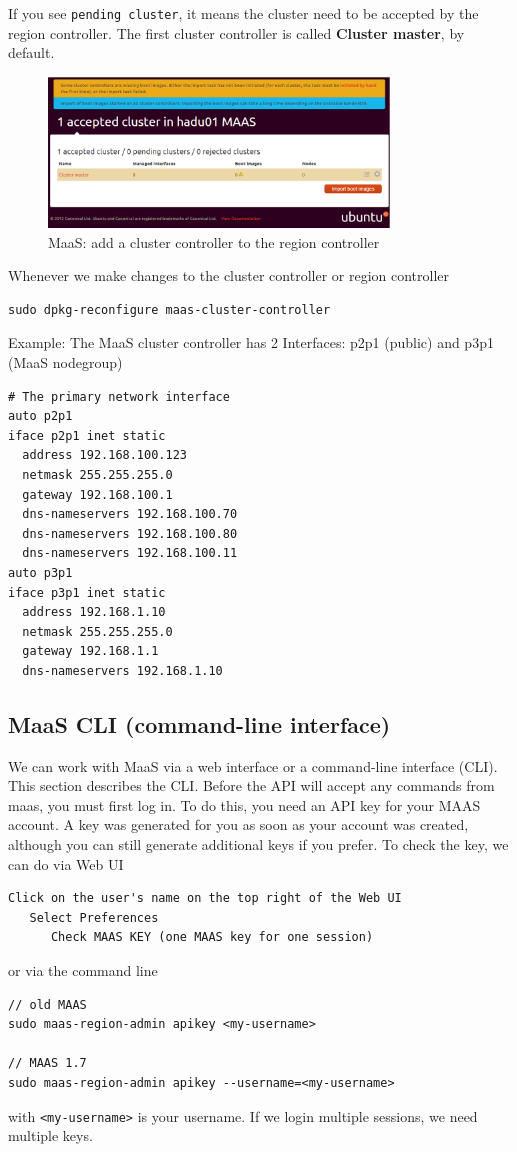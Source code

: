 If you see \verb!pending cluster!,
it means the cluster need to be accepted by the region controller. The first
cluster controller is called {\bf Cluster master}, by default.

\begin{figure}[hbt]
  \centerline{\includegraphics[height=4cm,
    angle=0]{./images/MaaS_cluster_controller.eps}}
\caption{MaaS: add a cluster controller to the region controller}
\label{fig:MaaS_cluster_controller}
\end{figure}

Whenever we make changes to the
cluster controller or region controller
\begin{verbatim}
sudo dpkg-reconfigure maas-cluster-controller 
\end{verbatim}

Example: The MaaS cluster controller has 2 Interfaces: p2p1 (public) and p3p1
(MaaS nodegroup)
\begin{verbatim}
# The primary network interface
auto p2p1
iface p2p1 inet static
  address 192.168.100.123
  netmask 255.255.255.0
  gateway 192.168.100.1
  dns-nameservers 192.168.100.70
  dns-nameservers 192.168.100.80
  dns-nameservers 192.168.100.11
auto p3p1
iface p3p1 inet static
  address 192.168.1.10
  netmask 255.255.255.0
  gateway 192.168.1.1
  dns-nameservers 192.168.1.10
\end{verbatim}



\subsection{MaaS CLI (command-line interface)}
\label{sec:MaaS_command-line}

We can work with MaaS via a web interface or a command-line interface (CLI).
This section describes the CLI.
Before the API will accept any commands from maas, you must first log in. To do
this, you need an API key for your MAAS account. A key was generated for you as
soon as your account was created, although you can still generate additional
keys if you prefer.  To check the key, we can do via Web UI
\begin{verbatim}
Click on the user's name on the top right of the Web UI
   Select Preferences
      Check MAAS KEY (one MAAS key for one session)
\end{verbatim}
or via the command line
\begin{verbatim}
// old MAAS
sudo maas-region-admin apikey <my-username>

// MAAS 1.7
sudo maas-region-admin apikey --username=<my-username>
\end{verbatim}
with \verb!<my-username>! is your username. If we login multiple sessions, we
need multiple keys.

